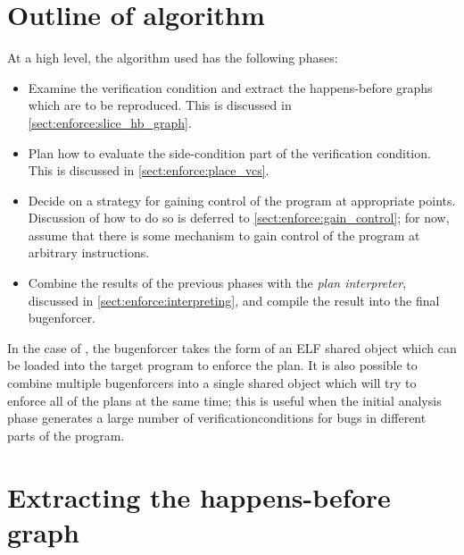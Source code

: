 \section{Outline of algorithm}

At a high level, the algorithm used has the following phases:

\begin{itemize}
\item
  Examine the verification condition and extract the happens-before
  graphs which are to be reproduced.  This is discussed in
  \autoref{sect:enforce:slice_hb_graph}.
\item
  Plan how to evaluate the side-condition part of the verification
  condition.  This is discussed in \autoref{sect:enforce:place_vcs}.
\item
  Decide on a strategy for gaining control of the program at
  appropriate points.  Discussion of how to do so is deferred to
  \autoref{sect:enforce:gain_control}; for now, assume that there is
  some mechanism to gain control of the program at arbitrary
  instructions.
\item
  Combine the results of the previous phases with the \emph{plan
    interpreter}, discussed in \autoref{sect:enforce:interpreting},
  and compile the result into the final \gls{bugenforcer}.
\end{itemize}

In the case of {\implementation}, the \gls{bugenforcer} takes the form
of an ELF shared object which can be loaded into the target program to
enforce the plan.  It is also possible to combine multiple
\glspl{bugenforcer} into a single shared object which will try to
enforce all of the plans at the same time; this is useful when the
initial analysis phase generates a large number of
\glspl{verificationcondition} for bugs in different parts of the
program.

\section{Extracting the happens-before graph}
\label{sect:enforce:slice_hb_graph}


